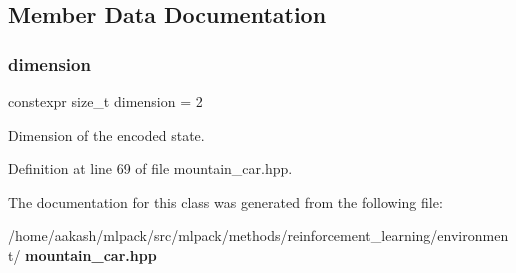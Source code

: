 \subsection{Member Data Documentation}
\mbox{\label{classmlpack_1_1rl_1_1MountainCar_1_1State_ae813298f34ef9d793885fc04b54dff99}} 
\subsubsection{dimension}
{\footnotesize\ttfamily constexpr size\+\_\+t dimension = 2\hspace{0.3cm}{\ttfamily [static]}}



Dimension of the encoded state. 



Definition at line 69 of file mountain\+\_\+car.\+hpp.



The documentation for this class was generated from the following file\+:\begin{DoxyCompactItemize}
\item 
/home/aakash/mlpack/src/mlpack/methods/reinforcement\+\_\+learning/environment/\textbf{ mountain\+\_\+car.\+hpp}\end{DoxyCompactItemize}
